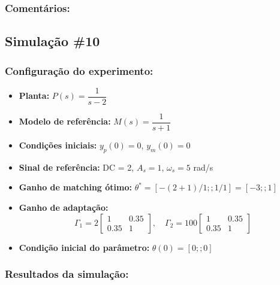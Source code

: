 \documentclass[10pt]{article}
\begin{document}
\subsubsection{Comentários:}

\subsection{Simulação \#10}
\subsubsection{Configuração do experimento:}
\begin{itemize}
\item \textbf{Planta:} $P(s) = \dfrac{1}{s - 2}$
\item \textbf{Modelo de referência:} $M(s) = \dfrac{1}{s + 1}$
\item \textbf{Condições iniciais:} $y_p(0)=0$, $y_m(0)=0$
\item \textbf{Sinal de referência:} DC = 2, $A_s=1$, $\omega_s=5$ rad/s
\item \textbf{Ganho de matching ótimo:} $\theta^* = [-(2+1)/1;;1/1] = [-3;;1]$
\item \textbf{Ganho de adaptação:} 
\[
\Gamma_1 = 2 \begin{bmatrix} 1 & 0.35 \\ 0.35 & 1 \end{bmatrix}, \quad
\Gamma_2 = 100 \begin{bmatrix} 1 & 0.35 \\ 0.35 & 1 \end{bmatrix}
\]
\item \textbf{Condição inicial do parâmetro:} $\theta(0) = [0;;0]$
\end{itemize}

\subsubsection{Resultados da simulação:}
\end{document}
